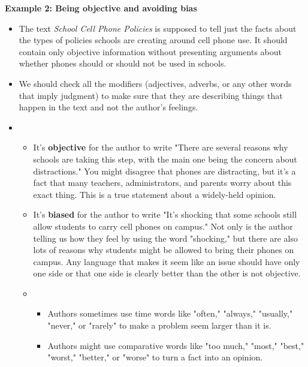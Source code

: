 \documentclass[12pt]{article}
\begin{document}
\begin{tcolorbox}[colframe=black!60, colback=white, 
coltitle=black, colbacktitle=black!15, fonttitle=\bfseries\Large, 
title=Examples, halign title=center, left=10pt, right=10pt, top=10pt, bottom=15pt]

\textbf{Example 2: Being objective and avoiding bias}
\begin{itemize}

    \item The text \textit{School Cell Phone Policies} is supposed to tell just the facts about the types of policies schools are creating around cell phone use. It should contain only objective information without presenting arguments about whether phones should or should not be used in schools.
    \item We should check all the modifiers (adjectives, adverbs, or any other words that imply judgment) to make sure that they are describing things that happen in the text and not the author's feelings.
    \item 
    \begin{itemize}
        \item It's \textbf{objective} for the author to write "There are several reasons why schools are taking this step, with the main one being the concern about distractions." You might disagree that phones are distracting, but it's a fact that many teachers, administrators, and parents worry about this exact thing. This is a true statement about a widely-held opinion.
        \item It's \textbf{biased} for the author to write "It's shocking that some schools still allow students to carry cell phones on campus." Not only is the author telling us how they feel by using the word "shocking," but there are also lots of reasons why students might be allowed to bring their phones on campus. Any language that makes it seem like an issue should have only one side or that one side is clearly better than the other is not objective.
        \item \begin{itemize}
            \item Authors sometimes use time words like "often," "always," "usually," "never," or "rarely" to make a problem seem larger than it is.
            \item Authors might use comparative words like "too much," "most," "best," "worst," "better," or "worse" to turn a fact into an opinion.
        \end{itemize}
    \end{itemize}
   
    \end{itemize}
    

\end{tcolorbox}
\end{document}
